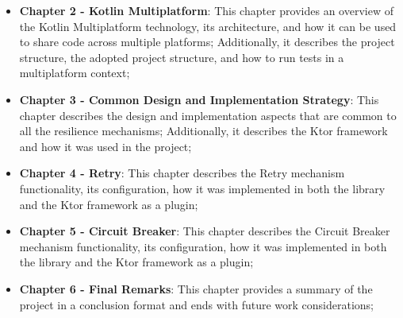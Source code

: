\begin{itemize}
    \item \textbf{Chapter 2 - Kotlin Multiplatform}: This chapter provides an overview of the Kotlin Multiplatform technology, its architecture, and how it can be used to share code across multiple platforms; Additionally, it describes the project structure, the adopted project structure, and how to run tests in a multiplatform context;
    \item \textbf{Chapter 3 - Common Design and Implementation Strategy}: This chapter describes the design and implementation aspects that are common to all the resilience mechanisms; Additionally, it describes the Ktor framework and how it was used in the project;
    \item \textbf{Chapter 4 - Retry}: This chapter describes the Retry mechanism functionality, its configuration, how it was implemented in both the library and the Ktor framework as a plugin;
    \item \textbf{Chapter 5 - Circuit Breaker}: This chapter describes the Circuit Breaker mechanism functionality, its configuration, how it was implemented in both the library and the Ktor framework as a plugin;
    \item \textbf{Chapter 6 - Final Remarks}: This chapter provides a summary of the project in a conclusion format and ends with future work considerations;
\end{itemize}
